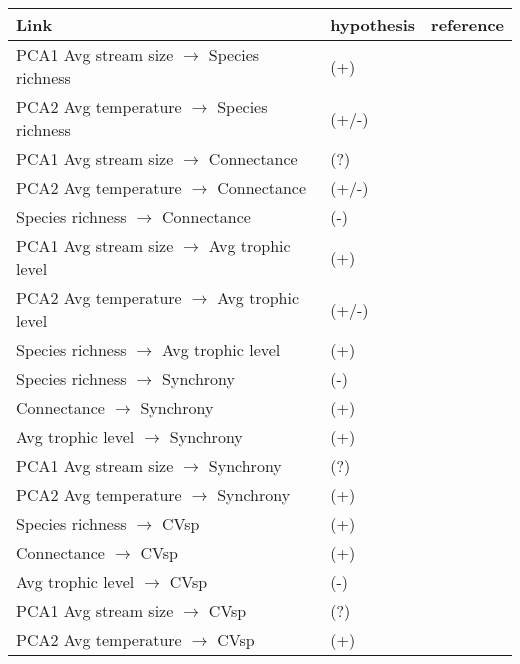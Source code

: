 \begin{tabular}{| m{7cm}| m{2cm}| m{4cm}|}
    \hline
    Link & hypothesis & reference\\
    \hline
    PCA1 Avg stream size $\to$ Species richness & (+) & \citet{post_ecosystem_2000,doi_resource_2009,mchugh_dual_2010} \\
    \hline
    PCA2 Avg temperature $\to$ Species richness & (+/-) & \citet{ogorman_unexpected_2017,gauzens_biodiversity_2020} \\
    \hline
    PCA1 Avg stream size $\to$ Connectance & (?) & \\
    \hline
    PCA2 Avg temperature $\to$ Connectance & (+/-) & \citet{petchey_predicting_2010} \\
    \hline
    Species richness $\to$ Connectance & (-) & \citet{winemiller_must_1989, dunne_network_2006} \\
    \hline
    PCA1 Avg stream size $\to$ Avg trophic level & (+) &
    \citet{mchugh_dual_2010, doi_resource_2009, post_ecosystem_2000}\\
    \hline
    PCA2 Avg temperature $\to$ Avg trophic level & (+/-) & \citet{ogorman_unexpected_2017}\\
    \hline
    Species richness $\to$ Avg trophic level & (+) & \citet{schneider_animal_2016}\\
    \hline
    Species richness $\to$ Synchrony & (-) & \citet{thebault_trophic_2005, loreau_species_2008, thibaut_understanding_2013} \\
    \hline
    Connectance $\to$ Synchrony & (+) & \citet{teng_dynamics_2004}\\
    \hline
    Avg trophic level $\to$ Synchrony & (+) & \citet{raimondo_interspecific_2004}\\
    \hline
    PCA1 Avg stream size $\to$ Synchrony & (?) & \\
    \hline
    PCA2 Avg temperature $\to$ Synchrony & (+) & \citet{loreau_species_2008}\\
    \hline
    Species richness $\to$ CVsp & (+) & \citep{tilman_biodiversity_1996} \\
    \hline
    Connectance $\to$ CVsp & (+) & \citep{thebault_trophic_2005}\\
    \hline
    Avg trophic level $\to$ CVsp & (-) & \citet{mccann_more_2009, shanafelt_stability_2018}\\
    \hline
    PCA1 Avg stream size $\to$ CVsp & (?) & \\
    \hline
    PCA2 Avg temperature $\to$ CVsp & (+) & \citep{ogorman_unexpected_2017, tabi_warming_2019}\\

\end{tabular}

